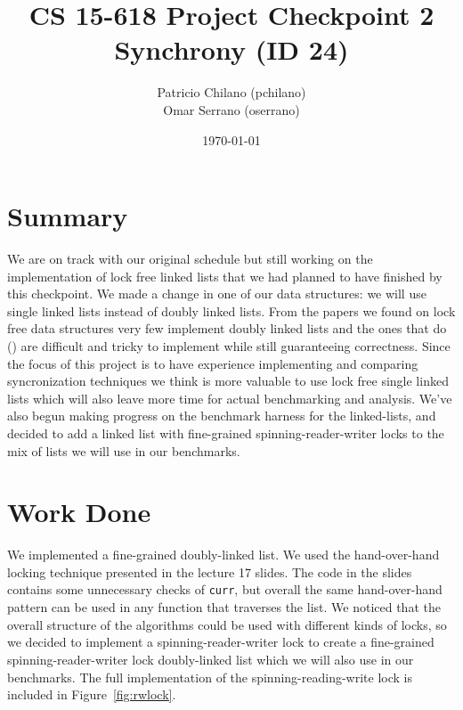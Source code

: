 \documentclass[11pt]{article}
\title{\vspace{-25pt}
\huge CS 15-618 Project Checkpoint 2 \\
\huge Synchrony (ID 24)
}
\author{
    Patricio Chilano (pchilano) \\
    Omar Serrano (oserrano)
}
\date{\today}
\begin{document}


\maketitle

\section*{Summary} We are on track with our original schedule but still working
on the implementation of lock free linked lists that we had planned to have
finished by this checkpoint.  We made a change in one of our data structures: we
will use single linked lists instead of doubly  linked lists. From the papers we
found on lock free data structures very  few implement doubly linked lists and
the ones that do (\cite{Sundell}) are difficult and tricky to implement while still
guaranteeing correctness. Since the focus of this project is to have experience
implementing  and comparing syncronization techniques we think is more valuable
to use lock free single linked lists  which will also leave more time for actual
benchmarking and analysis. We've also begun making progress on the benchmark
harness for the linked-lists, and decided to add a linked list with fine-grained
spinning-reader-writer locks to the mix of lists we will use in our benchmarks.

\section*{Work Done}
We implemented a fine-grained doubly-linked list. We used the hand-over-hand
locking technique presented in the lecture 17 slides. The code in the slides
contains some unnecessary checks of {\tt curr}, but overall the same
hand-over-hand pattern can be used in any function that traverses the list. We
noticed that the overall structure of the algorithms could be used with
different kinds of locks, so we decided to implement a spinning-reader-writer
lock to create a fine-grained spinning-reader-writer lock doubly-linked list
which we will also use in our benchmarks. The full implementation of the
spinning-reading-write lock is included in Figure~\ref{fig:rwlock}.
\end{document}
